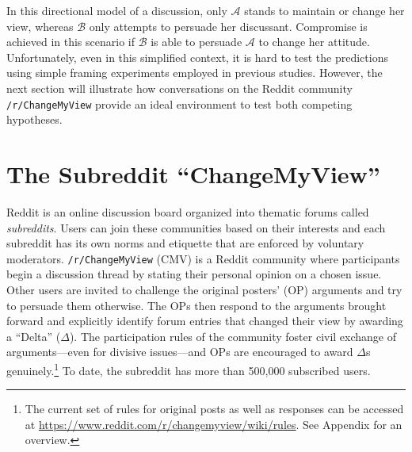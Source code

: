 In this directional model of a discussion, only $\mathcal{A}$ stands to maintain or change her view, whereas $\mathcal{B}$ only attempts to persuade her discussant. Compromise is achieved in this scenario if $\mathcal{B}$ is able to persuade $\mathcal{A}$ to change her attitude. Unfortunately, even in this simplified context, it is hard to test the predictions using simple framing experiments employed in previous studies. However, the next section will illustrate how conversations on the Reddit  community \texttt{/r/ChangeMyView} provide an ideal environment to test both competing hypotheses.



\section{The Subreddit ``ChangeMyView''}

Reddit is an online discussion board organized into thematic forums called \textit{subreddits}. Users can join these communities based on their interests and each subreddit has its own norms and etiquette that are enforced by voluntary moderators. \texttt{/r/ChangeMyView} (CMV) is a Reddit community where participants begin a discussion thread by stating their personal opinion on a chosen issue. Other users are invited to challenge the original posters' (OP) arguments and try to persuade them otherwise. The OPs then respond to the arguments brought forward and explicitly identify forum entries that changed their view by awarding a ``Delta'' ($\Delta$). The participation rules of the community foster civil exchange of arguments---even for divisive issues---and OPs are encouraged to award \(\Delta\)s genuinely.\footnote{The current set of rules for original posts as well as responses can be accessed at \url{https://www.reddit.com/r/changemyview/wiki/rules}. See Appendix for an overview.} To date, the subreddit has more than 500,000 subscribed users.



